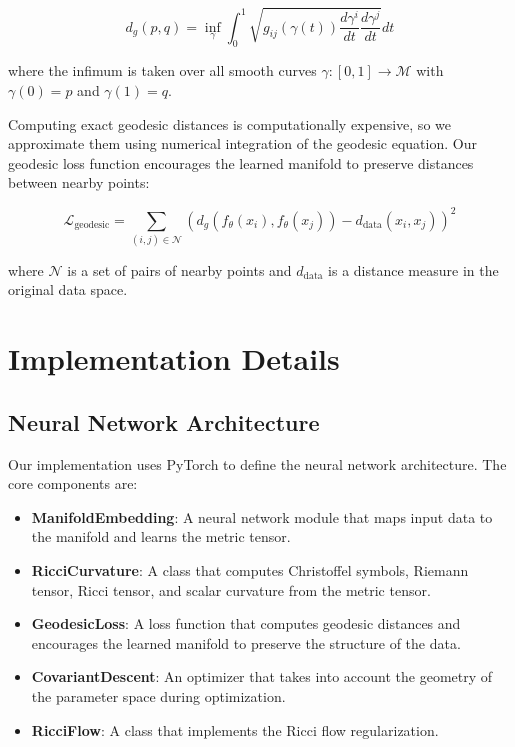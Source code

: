 \documentclass[11pt,a4paper]{article}
\begin{document}
\begin{equation}
    d_g(p, q) = \inf_{\gamma} \int_0^1 \sqrt{g_{ij}(\gamma(t)) \frac{d\gamma^i}{dt} \frac{d\gamma^j}{dt}} dt
\end{equation}

where the infimum is taken over all smooth curves $\gamma: [0, 1] \to \mathcal{M}$ with $\gamma(0) = p$ and $\gamma(1) = q$.

Computing exact geodesic distances is computationally expensive, so we approximate them using numerical integration of the geodesic equation. Our geodesic loss function encourages the learned manifold to preserve distances between nearby points:

\begin{equation}
    \mathcal{L}_{\text{geodesic}} = \sum_{(i,j) \in \mathcal{N}} \left( d_g(f_\theta(x_i), f_\theta(x_j)) - d_{\text{data}}(x_i, x_j) \right)^2
\end{equation}

where $\mathcal{N}$ is a set of pairs of nearby points and $d_{\text{data}}$ is a distance measure in the original data space.

\section{Implementation Details}
\subsection{Neural Network Architecture}

Our implementation uses PyTorch to define the neural network architecture. The core components are:

\begin{itemize}
    \item \textbf{ManifoldEmbedding}: A neural network module that maps input data to the manifold and learns the metric tensor.
    
    \item \textbf{RicciCurvature}: A class that computes Christoffel symbols, Riemann tensor, Ricci tensor, and scalar curvature from the metric tensor.
    
    \item \textbf{GeodesicLoss}: A loss function that computes geodesic distances and encourages the learned manifold to preserve the structure of the data.
    
    \item \textbf{CovariantDescent}: An optimizer that takes into account the geometry of the parameter space during optimization.
    
    \item \textbf{RicciFlow}: A class that implements the Ricci flow regularization.
\end{itemize}
\end{document}
